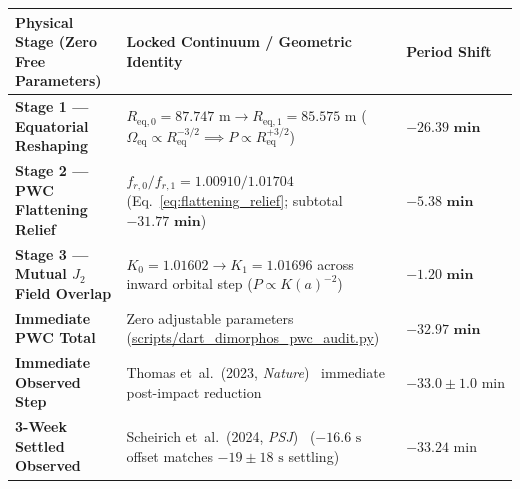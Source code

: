 \documentclass[11pt,a4paper]{article}
\begin{document}
\begin{tcolorbox}[colback=gray!4!white,colframe=black!65!white,title={Pre-Registered Blind Ledger 7.1: Zero-Parameter 3-Stage Dimorphos Period-Shift Decomposition}]
\scriptsize
\setlength{\tabcolsep}{3.5pt}
\renewcommand{\arraystretch}{1.22}
\begin{tabularx}{\textwidth}{L{4.3cm} Y R{2.4cm}}
\toprule
\textbf{Physical Stage (Zero Free Parameters)} & \textbf{Locked Continuum / Geometric Identity} & \textbf{Period Shift} \\
\midrule
\textbf{Stage 1 --- Equatorial Reshaping} & $R_{\text{eq},0} = 87.747\text{ m} \to R_{\text{eq},1} = 85.575\text{ m}$ ($\Omega_{\text{eq}} \propto R_{\text{eq}}^{-3/2} \implies P \propto R_{\text{eq}}^{+3/2}$) & $\mathbf{-26.39\text{ min}}$ \\
\textbf{Stage 2 --- PWC Flattening Relief} & $f_{r,0} / f_{r,1} = 1.00910 / 1.01704$ (Eq.~\ref{eq:flattening_relief}; subtotal $\mathbf{-31.77\text{ min}}$) & $\mathbf{-5.38\text{ min}}$ \\
\textbf{Stage 3 --- Mutual $J_2$ Field Overlap} & $K_0 = 1.01602 \to K_1 = 1.01696$ across inward orbital step ($P \propto K(a)^{-2}$) & $\mathbf{-1.20\text{ min}}$ \\
\midrule
\textbf{Immediate PWC Total} & Zero adjustable parameters (\url{scripts/dart_dimorphos_pwc_audit.py}) & $\mathbf{-32.97\text{ min}}$ \\
\textbf{Immediate Observed Step} & Thomas et~al.~(2023, \textit{Nature})~\cite{Thomas2023} immediate post-impact reduction & $-33.0 \pm 1.0\text{ min}$ \\
\textbf{3-Week Settled Observed} & Scheirich et~al.~(2024, \textit{PSJ})~\cite{Scheirich2024} ($-16.6\text{ s}$ offset matches $-19 \pm 18\text{ s}$ settling) & $-33.24\text{ min}$ \\
\bottomrule
\end{tabularx}
\end{tcolorbox}
\end{document}
